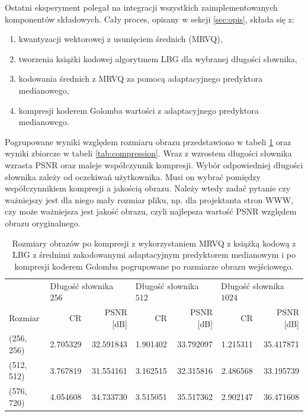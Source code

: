 \documentclass{article}
\begin{document}
Ostatni eksperyment polegał na integracji wszystkich zaimplementowanych komponentów składowych. Cały proces, opisany w sekcji \ref{sec:opis}, składa się z:

\begin{enumerate}
    \item kwantyzacji wektorowej z usunięciem średnich (MRVQ),
    \item tworzenia książki kodowej algorytmem LBG dla wybranej długości słownika,
    \item kodowania średnich z MRVQ za pomocą adaptacyjnego predyktora medianowego,
    \item kompresji koderem Golomba wartości z adaptacyjnego predyktora medianowego.
\end{enumerate}

Pogrupowane wyniki względem rozmiaru obrazu przedstawiono w tabeli \ref{tab:compression_agg} oraz wyniki zbiorcze w tabeli \ref{tab:compression}. Wraz z wzrostem długości słownika wzrasta PSNR oraz maleje współczynnik kompresji. Wybór odpowiedniej długości słownika zależy od oczekiwań użytkownika. Musi on wybrać pomiędzy współczynnikiem kompresji a jakością obrazu. Należy wtedy zadać pytanie czy ważniejszy jest dla niego mały rozmiar pliku, np. dla projektanta stron WWW, czy może ważniejsza jest jakość obrazu, czyli najlepsza wartość PSNR względem obrazu oryginalnego.

\begin{table}[H]
  \caption{Rozmiary obrazów po kompresji z wykorzystaniem MRVQ z książką kodową z LBG z średnimi zakodowanymi adaptacyjnym predyktorem medianowym i po kompresji koderem Golomba pogrupowane po rozmiarze obrazu wejściowego.}
  \label{tab:compression_agg}
  \centering
\begin{tabular}{lrrrrrr}
\toprule
{} & \multicolumn{2}{l}{Długość słownika $256$} & \multicolumn{2}{l}{Długość słownika $512$} & \multicolumn{2}{l}{Długość słownika $1024$} \\
    \cmidrule(lr){2-3}
    \cmidrule(lr){4-5}
    \cmidrule(lr){6-7}
    Rozmiar &    CR &   PSNR [dB] &    CR &   PSNR [dB] &   CR &  PSNR [dB] \\
\midrule
(256, 256) &  2.705329 &  32.591843 &  1.901402 &  33.792097 &  1.215311 &  35.417871 \\
(512, 512) &  3.767819 &  31.554161 &  3.162515 &  32.315816 &  2.486568 &  33.195739 \\
(576, 720) &  4.054608 &  34.733730 &  3.515051 &  35.517362 &  2.902147 &  36.471608 \\
\bottomrule
\end{tabular}
\end{table}
\end{document}
